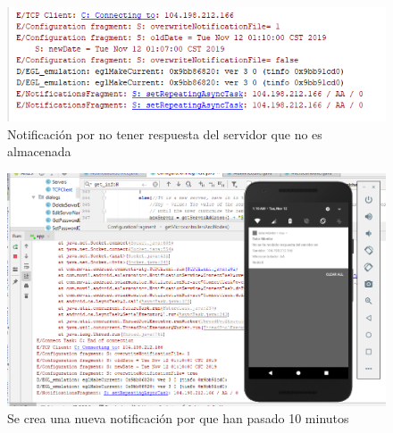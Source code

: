 \begin{figure}[H]
	\centering
	\includegraphics[scale=.7]{Capitulo5/images/muestra8.png}
	\caption{Notificación por no tener respuesta del servidor que no es almacenada}	
	\label{fig:muestra 8}
\end{figure} 

\begin{figure}[H]
	\centering
	\includegraphics[scale=.6]{Capitulo5/images/muestra9.png}
	\caption{Se crea una nueva notificación por que han pasado 10 minutos}	
	\label{fig:muestra 9}
\end{figure} 

